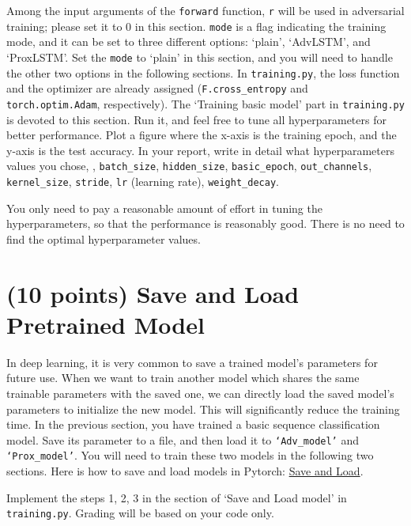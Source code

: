 \documentclass[11pt]{report}
\begin{document}
Among the input arguments of the \texttt{forward} function, 
\texttt{r} will be used in adversarial training; 
please set it to 0 in this section. 
\texttt{mode} is a flag indicating the training mode, 
and it can be set to three different options: `plain', `AdvLSTM', and `ProxLSTM'. 
Set the \texttt{mode} to `plain' in this section, 
and you will need to handle the other two options in the following sections. 
In \texttt{training.py}, the loss function and the optimizer are already assigned (\texttt{F.cross\_entropy} and \texttt{torch.optim.Adam}, respectively). 
The `Training basic model' part in \texttt{training.py} is devoted to  this section.
Run it, and feel free to tune all hyperparameters for better performance. 
Plot a figure where the x-axis is the training epoch, 
and the y-axis is the test accuracy.
In your report, write in detail what hyperparameters values you chose,
\eg, \texttt{batch\_size}, \texttt{hidden\_size}, \texttt{basic\_epoch}, \texttt{out\_channels}, \texttt{kernel\_size},  \texttt{stride}, \texttt{lr} (learning rate), \texttt{weight\_decay}.

You only need to pay a reasonable amount of effort in tuning the hyperparameters, 
so that the performance is reasonably good.
There is no need to find the optimal hyperparameter values.


\section{(10 points)  Save and Load Pretrained Model}
\label{sec:saveload}

In deep learning, it is very common to save a trained model's parameters for future use. 
When we want to train another model which shares the same trainable parameters with the saved one, 
we can directly load the saved model's parameters to initialize the new model. 
This will significantly reduce the training time. 
In the previous section, 
you have trained a basic sequence classification model.
Save its parameter to a file, 
and then load it to \texttt{`Adv\_model'} and \texttt{`Prox\_model'}. You will need to train these two models in the following two sections. Here is how to save and load models in Pytorch: \href{https://pytorch.org/tutorials/beginner/saving_loading_models.html}{Save and Load}.

Implement the steps 1, 2, 3 in the section of `Save and Load model' in \texttt{training.py}.
Grading will be based on your code only.
    
\end{document}
